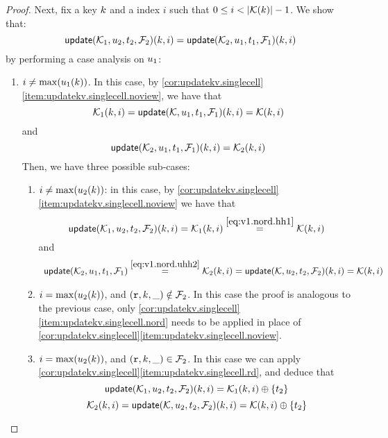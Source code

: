\begin{proof}
Next, fix a key $k$ and a index $i$ such that $0 \leq i < \lvert  \mathcal{K}(k)  \rvert - 1$. 
We show that:
\[ 
    \mathsf{update}(\mathcal{K}_1,u_2,t_2,\mathcal{F}_2)(k, i) = \mathsf{update}(\mathcal{K}_2, u_1, t_1, \mathcal{F}_1)(k, i)
\]
by performing a case analysis on $u_1$: 
\begin{enumerate}
\item $i \neq \max(u_1(k))$. 
In this case, by \cref{cor:updatekv.singlecell}\cref{item:updatekv.singlecell.noview}, 
we have that 
\begin{equation}
\mathcal{K}_1(k, i) = \mathsf{update}(\mathcal{K}, u_1, t_1, \mathcal{F}_1)(k, i) = \mathcal{K}(k, i)
\label{eq:v1.nord.hh1}
\end{equation}
and 
\begin{equation}
\mathsf{update}(\mathcal{K}_2, u_1, t_1, \mathcal{F}_1)(k, i) = \mathcal{K}_2(k, i)
\label{eq:v1.nord.uhh2}
\end{equation}
Then, we have three possible sub-cases: 
\begin{enumerate}
\item $i \neq \max(u_2(k))$: in this case, by \cref{cor:updatekv.singlecell}\cref{item:updatekv.singlecell.noview} we have that 
\[\updateKV(\hh_1, \vi_2, \txid_2, \opset_2)(\ke, i) = 
\hh_1(\ke, i) \stackrel{\cref{eq:v1.nord.hh1}}{=} \hh(\ke, i)
\]
and
\[
\begin{array}{l}
\updateKV(\hh_2, \vi_1, \txid_1, \opset_1) \stackrel{\cref{eq:v1.nord.uhh2}}{=} \hh_2(\ke,i) = 
\updateKV(\hh, \vi_2, \txid_2, \opset_2)(\ke, i) = \hh(\ke, i)
\end{array}
\]
\item $i = \max(u_2(k))$, and $(\textnormal{\texttt r}, k, \_) \notin \mathcal{F}_2$. In this case the proof is analogous to the previous case, 
only \cref{cor:updatekv.singlecell}\cref{item:updatekv.singlecell.nord} needs to be applied in place 
of \cref{cor:updatekv.singlecell}\cref{item:updatekv.singlecell.noview}.
\item $i = \max(u_2(k))$, and $(\textnormal{\texttt r}, k, \_) \in \mathcal{F}_2$. In this case we can apply \cref{cor:updatekv.singlecell}\cref{item:updatekv.singlecell.rd}, 
and deduce that 
\begin{equation}
\mathsf{update}(\mathcal{K}_1, u_2, t_2, \mathcal{F}_2)(k, i) = \mathcal{K}_1(k, i) \oplus \{t_2\}
\label{eq:v1.nord.v2.rd.uhh1}
\end{equation}
\begin{equation}
\mathcal{K}_2(k, i) = \mathsf{update}(\mathcal{K}, u_2, t_2, \mathcal{F}_2)(k, i) = \mathcal{K}(k,i) \oplus \{t_2\}
\label{eq:v1.nord.v2.rd.hh2}
\end{equation}

\end{enumerate}
\end{enumerate}
\end{proof}
